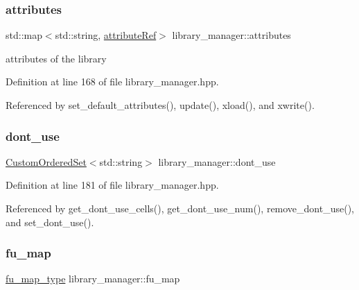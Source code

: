 \subsubsection{\texorpdfstring{attributes}{attributes}}
{\footnotesize\ttfamily std\+::map$<$std\+::string, \hyperlink{library__manager_8hpp_a46399d2eacc03fb10f84fb33987ab8e3}{attribute\+Ref}$>$ library\+\_\+manager\+::attributes\hspace{0.3cm}{\ttfamily [private]}}



attributes of the library 



Definition at line 168 of file library\+\_\+manager.\+hpp.



Referenced by set\+\_\+default\+\_\+attributes(), update(), xload(), and xwrite().

\mbox{\label{classlibrary__manager_a6166670fafe2b957bd18c46fc0406ee2}} 
\subsubsection{\texorpdfstring{dont\+\_\+use}{dont\_use}}
{\footnotesize\ttfamily \hyperlink{classCustomOrderedSet}{Custom\+Ordered\+Set}$<$std\+::string$>$ library\+\_\+manager\+::dont\+\_\+use\hspace{0.3cm}{\ttfamily [private]}}



Definition at line 181 of file library\+\_\+manager.\+hpp.



Referenced by get\+\_\+dont\+\_\+use\+\_\+cells(), get\+\_\+dont\+\_\+use\+\_\+num(), remove\+\_\+dont\+\_\+use(), and set\+\_\+dont\+\_\+use().

\mbox{\label{classlibrary__manager_a56275437810dccb628120827741c7822}} 
\subsubsection{\texorpdfstring{fu\+\_\+map}{fu\_map}}
{\footnotesize\ttfamily \hyperlink{classlibrary__manager_a17941addb97906d7b41c5b0b0317fde2}{fu\+\_\+map\+\_\+type} library\+\_\+manager\+::fu\+\_\+map\hspace{0.3cm}{\ttfamily [private]}}



